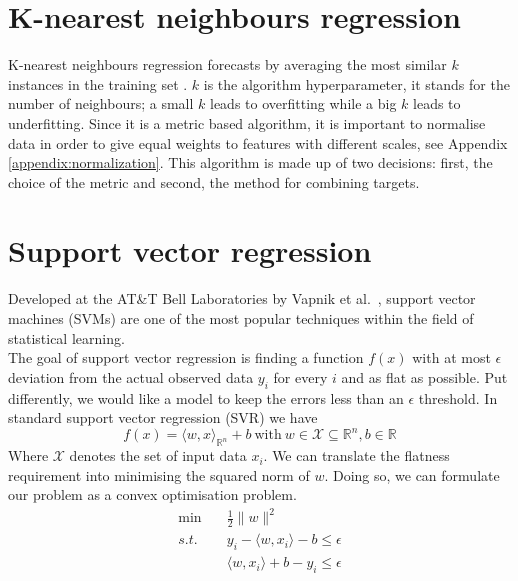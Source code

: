 \section{K-nearest neighbours regression}
K-nearest neighbours regression forecasts by averaging the most similar $k$ instances in the training set \cite{macqueen1967some}. $k$ is the algorithm hyperparameter, it stands for the number of neighbours; a small $k$ leads to overfitting while a big $k$ leads to underfitting. 
Since it is a metric based algorithm, it is important to normalise data in order to give equal weights to features with different scales, see Appendix \ref{appendix:normalization}.
This algorithm is made up of two decisions: first, the choice of the metric and second, the method for combining targets.


\section{Support vector regression}
Developed at the AT\&T Bell Laboratories by Vapnik et al.\ \cite{cortes1995support, vapnik1997support}, support vector machines (SVMs) are one of the most popular techniques within the field of statistical learning.
\\
The goal of support vector regression is finding a function $f(x)$ with at most $\epsilon$ deviation from the actual observed data $y_i$ for every $i$ and as flat as possible. 
Put differently, we would like a model to keep the errors less than an $\epsilon$ threshold.  
In standard support vector regression (SVR) we have
\begin{equation}
    f(x)=\langle w,x \rangle_{\mathbb{R}^n} +b \ \textrm{with} \ w \in \mathcal{X} \subseteq \mathbb{R}^n, b \in \mathbb{R}
\end{equation}
Where $\mathcal{X}$ denotes the set of input data $x_i$.
We can translate the flatness requirement into minimising the squared norm of $w$. Doing so, we can formulate our problem as a convex optimisation problem.
\begin{equation}
    \begin{aligned}
        \min \quad& \frac{1}{2}\|w\|^2
        \\
        s.t. \quad& y_i-\langle w, x_i\rangle-b\leq \epsilon
        \\
        \quad& \langle w, x_i\rangle +b-y_i\leq \epsilon
    \end{aligned}
\end{equation}
